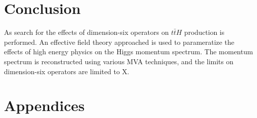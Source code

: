 \documentclass[NOTE, atlasdraft=true, texlive=2016, UKenglish]{\ATLASLATEXPATH atlasdoc}
\begin{document}

\part{Conclusion}
\label{part:conclusion}

As search for the effects of dimension-six operators on $t\bar{t}H$ production is performed. An effective field theory approached is used to parameratize the effects of high energy physics on the Higgs momentum spectrum. The momentum spectrum is reconstructed using various MVA techniques, and the limits on dimension-six operators are limited to X. 


\printbibliography
%
%

\clearpage
{}


\clearpage
\appendix
\part*{Appendices}

\section{}
\end{document}
